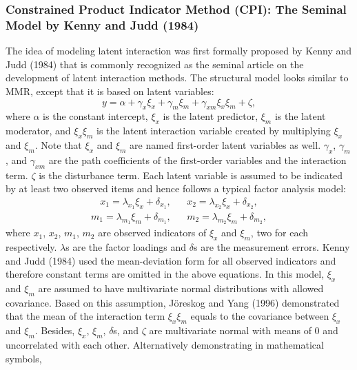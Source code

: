 \documentclass[
  man]{apa6}
\begin{document}
\hypertarget{constrained-product-indicator-method-cpi-the-seminal-model-by-kenny-and-judd-1984}{%
\subsubsection{Constrained Product Indicator Method (CPI): The Seminal Model by Kenny and Judd (1984)}\label{constrained-product-indicator-method-cpi-the-seminal-model-by-kenny-and-judd-1984}}

The idea of modeling latent interaction was first formally proposed by Kenny and Judd (1984) that is commonly recognized as the seminal article on the development of latent interaction methods. The structural model looks similar to MMR, except that it is based on latent variables:
\begin{equation}
y = \alpha + \gamma_{x}\xi_{x} + \gamma_{m}\xi_{m} + \gamma_{xm}\xi_{x}\xi_{m} + \zeta,
\end{equation}
where \(\alpha\) is the constant intercept, \(\xi_{x}\) is the latent predictor, \(\xi_{m}\) is the latent moderator, and \(\xi_{x}\xi_{m}\) is the latent interaction variable created by multiplying \(\xi_{x}\) and \(\xi_{m}\). Note that \(\xi_{x}\) and \(\xi_{m}\) are named first-order latent variables as well. \(\gamma_{x}\), \(\gamma_{m}\), and \(\gamma_{xm}\) are the path coefficients of the first-order variables and the interaction term. \(\zeta\) is the disturbance term. Each latent variable is assumed to be indicated by at least two observed items and hence follows a typical factor analysis model:
\begin{align}
x_{1} = \lambda_{x_{1}}\xi_{x} + \delta_{x_{1}}, && x_{2} = \lambda_{x_{2}}\xi_{x} + \delta_{x_{2}},
\end{align}
\begin{align}
m_{1} = \lambda_{m_{1}}\xi_{m} + \delta_{m_{1}}, && m_{2} = \lambda_{m_{2}}\xi_{m} + \delta_{m_{2}},
\end{align}
where \(x_{1}\), \(x_{2}\), \(m_{1}\), \(m_{2}\) are observed indicators of \(\xi_{x}\) and \(\xi_{m}\), two for each respectively. \(\lambda\)s are the factor loadings and \(\delta\)s are the measurement errors. Kenny and Judd (1984) used the mean-deviation form for all observed indicators and therefore constant terms are omitted in the above equations. In this model, \(\xi_{x}\) and \(\xi_{m}\) are assumed to have multivariate normal distributions with allowed covariance. Based on this assumption, Jöreskog and Yang (1996) demonstrated that the mean of the interaction term \(\xi_{x}\xi_{m}\) equals to the covariance between \(\xi_{x}\) and \(\xi_{m}\). Besides, \(\xi_{x}\), \(\xi_{m}\), \(\delta\)s, and \(\zeta\) are multivariate normal with means of 0 and uncorrelated with each other. Alternatively demonstrating in mathematical symbols,
\end{document}
